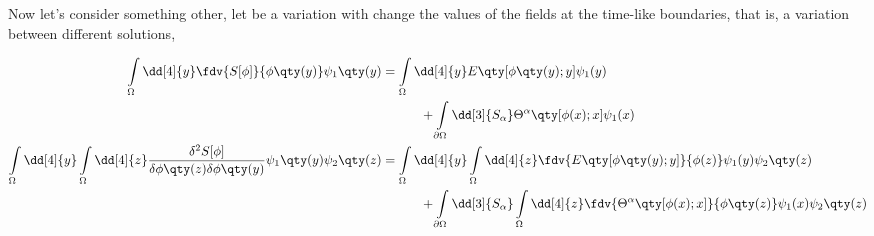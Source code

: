 
Now let's consider something other, let be a variation with change the values of the fields at the time-like boundaries, that is, 
a variation between different solutions,

\begin{align}
    \int\limits_{\Omega}\dd[4]{y}\fdv{S[\phi]}{\phi\qty(y)}\psi_1\qty(y)&=\int\limits_{\Omega}\dd[4]{y}E\qty[\phi\qty(y);y]\psi_1(y)\nonumber\\
    &\quad\quad\quad+\int\limits_{\partial\Omega}\dd[3]{S_{\alpha}}\Theta^\alpha\qty[\phi(x);x]\psi_1(x)\\
    \int\limits_{\Omega}\dd[4]{y}\int\limits_{\Omega}\dd[4]{z}\frac{\delta^2 S[\phi]}{\delta\phi\qty(z)\delta\phi\qty(y)}\psi_1\qty(y)\psi_2\qty(z)&=\int\limits_{\Omega}\dd[4]{y}\int\limits_{\Omega}\dd[4]{z}\fdv{E\qty[\phi\qty(y);y]}{\phi(z)}\psi_1(y)\psi_2\qty(z)\nonumber\\
    &\quad\quad\quad+\int\limits_{\partial\Omega}\dd[3]{S_{\alpha}}\int\limits_{\Omega}\dd[4]{z}\fdv{\Theta^\alpha\qty[\phi(x);x]}{\phi\qty(z)}\psi_1(x)\psi_2\qty(z)\\
\end{align}

